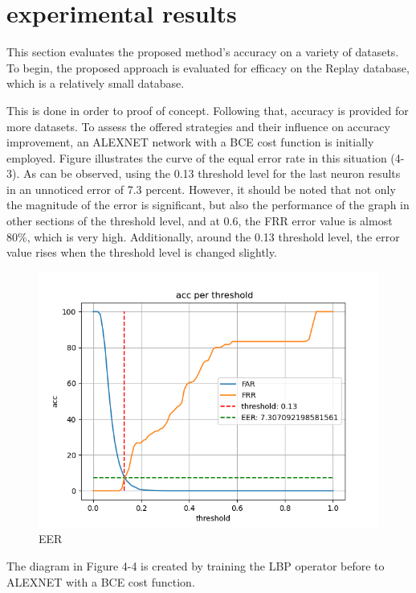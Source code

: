 \documentclass[journal]{IEEEtran}
\begin{document}
\section{experimental results }

This section evaluates the proposed method's accuracy on a variety of datasets. To begin, the proposed approach is evaluated for efficacy on the Replay database, which is a relatively small database.

This is done in order to proof of concept. Following that, accuracy is provided for more datasets. To assess the offered strategies and their influence on accuracy improvement, an ALEXNET network with a BCE cost function is initially employed. Figure illustrates the curve of the equal error rate in this situation (4-3). As can be observed, using the 0.13 threshold level for the last neuron results in an unnoticed error of 7.3 percent. However, it should be noted that not only the magnitude of the error is significant, but also the performance of the graph in other sections of the threshold level, and at 0.6, the FRR error value is almost 80\%, which is very high. Additionally, around the 0.13 threshold level, the error value rises when the threshold level is changed slightly.

\begin{figure}[h]
	\centerline{\includegraphics[width=\linewidth]{eer-alex-bce}}
	\caption{EER}
	\label{fig:eer-alex-bce}
\end{figure}

The diagram in Figure 4-4 is created by training the LBP operator before to ALEXNET with a BCE cost function.
\end{document}
